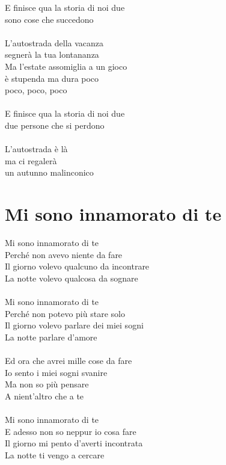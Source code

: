 \documentclass[letter,11pt]{article}
\begin{document}
\begin{multicols}{2}
E finisce qua la storia di noi due \\
sono cose che succedono \\
\\
L'autostrada della vacanza \\
segnerà la tua lontananza \\
Ma l'estate assomiglia a un gioco \\
è stupenda ma dura poco \\
poco, poco, poco \\
\\
E finisce qua la storia di noi due \\
due persone che si perdono \\
\\
L'autostrada è là \\
ma ci regalerà \\
un autunno malinconico \\
\end{multicols}

\section*{Mi sono innamorato di te}
\vskip 0.2in

\begin{multicols}{2}
\noindent Mi sono innamorato di te \\
Perché non avevo niente da fare \\
Il giorno volevo qualcuno da incontrare \\
La notte volevo qualcosa da sognare \\
\\
Mi sono innamorato di te\\
Perché non potevo più stare solo \\
Il giorno volevo parlare dei miei sogni \\
La notte parlare d'amore \\
\\
Ed ora che avrei mille cose da fare \\
Io sento i miei sogni svanire \\
Ma non so più pensare \\
A nient'altro che a te \\
\\
Mi sono innamorato di te \\
E adesso non so neppur io cosa fare \\
Il giorno mi pento d'averti incontrata \\
La notte ti vengo a cercare \\
\end{multicols}
\end{document}

